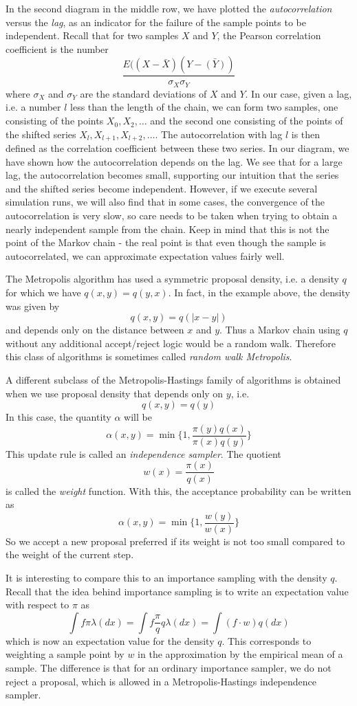 \documentclass[a4paper, draft]{article}
\theoremstyle{own}
\theoremstyle{remark}
\begin{document}
In the second diagram in the middle row, we have plotted the {\em autocorrelation} versus the {\em lag}, as an indicator for the failure of the sample points to be independent. Recall that for two samples $X$ and $Y$, the Pearson correlation coefficient is the number
$$
\frac{E((X-\bar{X})(Y-\bar{(Y)})}{\sigma_X \sigma_Y}
$$
where $\sigma_X$ and $\sigma_Y$ are the standard deviations of $X$ and $Y$. In our case, given a lag, i.e. a number $l$ less than the length of the chain, we can form two samples, one consisting of the points $X_0, X_2, \dots$ and the second one consisting of the points of the shifted series $X_l, X_{l+1}, X_{l+2}, \dots$. The autocorrelation with lag $l$ is then defined as the correlation coefficient between these two series. In our diagram, we have shown how the autocorrelation depends on the lag. We see that for a large lag, the autocorrelation becomes small, supporting our intuition that the series and the shifted series become independent. However, if we execute several simulation runs, we will also find that in some cases, the convergence of the autocorrelation is very slow, so care needs to be taken when trying to obtain a nearly independent sample from the chain. Keep in mind that this is not the point of the Markov chain - the real point is that even though the sample is autocorrelated, we can approximate expectation values fairly well.

The Metropolis algorithm has used a symmetric proposal density, i.e. a density $q$ for which we have $q(x,y) = q(y,x)$. In fact, in the example above, the density was given by
$$
q(x,y) = q(|x-y|)
$$
and depends only on the distance between $x$ and $y$. Thus a Markov chain using $q$ without any additional accept/reject logic would be a random walk. Therefore this class of algorithms is sometimes called {\em random walk Metropolis}. 

A different subclass of the Metropolis-Hastings family of algorithms is obtained when we use proposal density that depends only on $y$, i.e.
$$
q(x,y) = q(y)
$$
In this case, the quantity $\alpha$ will be
$$
\alpha(x,y) = \min \{1, \frac{\pi(y) q(x)}{\pi(x) q(y)} \}
$$
This update rule is called an {\em independence sampler}. The quotient
$$
w(x) = \frac{\pi(x)}{q(x)}
$$
is called the {\em weight} function. With this, the acceptance probability can be written as
$$
\alpha(x,y) = \min \{1, \frac{w(y)}{w(x)} \}
$$
So we accept a new proposal preferred if its weight is not too small compared to the weight of the current step. 

It is interesting to compare this to an importance sampling with the density $q$. Recall that the idea behind importance sampling is to write an expectation value
with respect to $\pi$ as
$$
\int f \pi \lambda(dx) = \int f \frac{\pi}{q} q \lambda(dx) = 
\int (f \cdot w) q(dx)
$$
which is now an expectation value for the density $q$. This corresponds to weighting a sample point by $w$ in the approximation by the empirical mean of a sample. The difference is that for an ordinary importance sampler, we do not reject a proposal, which is allowed in a Metropolis-Hastings independence sampler.
 
\end{document}
